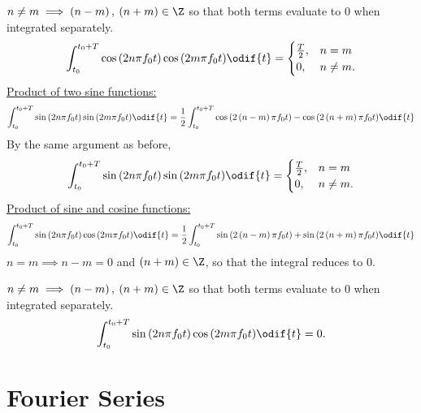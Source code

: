 \documentclass{article}
\begin{document}
\(n \neq m \implies \left( n - m \right),\: \left( n + m \right) \in \Z\) so that both terms evaluate to \(0\) when integrated separately.
\begin{equation*}
    \int_{t_0}^{t_0 + T} \cos{\left( 2n \pi f_0 t \right)} \cos{\left( 2m \pi f_0 t \right)} \odif{t} = \begin{cases}
        \frac{T}{2}, & n = m     \\
        0,           & n \neq m.
    \end{cases}
\end{equation*}
\underline{Product of two sine functions:}
\begin{equation*}
    \int_{t_0}^{t_0 + T} \sin{\left( 2n \pi f_0 t \right)} \sin{\left( 2m \pi f_0 t \right)} \odif{t} = \frac{1}{2} \int_{t_0}^{t_0 + T} \cos{\left( 2 \left( n - m \right) \pi f_0 t \right)} - \cos{\left( 2 \left( n + m \right) \pi f_0 t \right)} \odif{t}
\end{equation*}
By the same argument as before,
\begin{equation*}
    \int_{t_0}^{t_0 + T} \sin{\left( 2n \pi f_0 t \right)} \sin{\left( 2m \pi f_0 t \right)} \odif{t} = \begin{cases}
        \frac{T}{2}, & n = m     \\
        0,           & n \neq m.
    \end{cases}
\end{equation*}
\underline{Product of sine and cosine functions:}
\begin{equation*}
    \int_{t_0}^{t_0 + T} \sin{\left( 2n \pi f_0 t \right)} \cos{\left( 2m \pi f_0 t \right)} \odif{t} = \frac{1}{2} \int_{t_0}^{t_0 + T} \sin{\left( 2 \left( n - m \right) \pi f_0 t \right)} + \sin{\left( 2 \left( n + m \right) \pi f_0 t \right)} \odif{t}
\end{equation*}
\(n = m \implies n - m = 0\) and \(\left( n + m \right) \in \Z\), so that the integral reduces to \(0\).

\(n \neq m \implies \left( n - m \right),\: \left( n + m \right) \in \Z\) so that both terms evaluate to \(0\) when integrated separately.
\begin{equation*}
    \int_{t_0}^{t_0 + T} \sin{\left( 2n \pi f_0 t \right)} \cos{\left( 2m \pi f_0 t \right)} \odif{t} = 0.
\end{equation*}
\section{Fourier Series}
\end{document}
